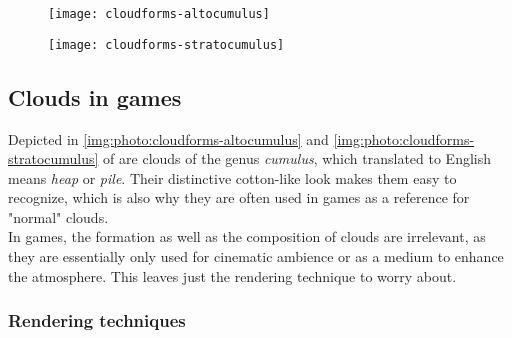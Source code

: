 \begin{figure}[ht]
    \centering
        \begin{minipage}{0.47\linewidth}
            \texttt{[image: cloudforms-altocumulus]}
            \label{img:photo:cloudforms-altocumulus}        
        \end{minipage}        
    \hfill
        \begin{minipage}{0.47\linewidth}
            \texttt{[image: cloudforms-stratocumulus]}
            \label{img:photo:cloudforms-stratocumulus}        
        \end{minipage}  
\end{figure}



\subsection{Clouds in games}
Depicted in \autoref{img:photo:cloudforms-altocumulus} and \autoref{img:photo:cloudforms-stratocumulus} of  are clouds of the genus \textit{cumulus}, which translated to English means \textit{heap} or \textit{pile}.
Their distinctive cotton-like look makes them easy to recognize, which is also why they are often used in games as a reference for "normal" clouds. 
\\
In games, the formation as well as the composition of clouds are irrelevant, as they are essentially only used for cinematic ambience or as a medium to enhance the atmosphere. This leaves just the rendering technique to worry about.

\subsubsection{Rendering techniques}
